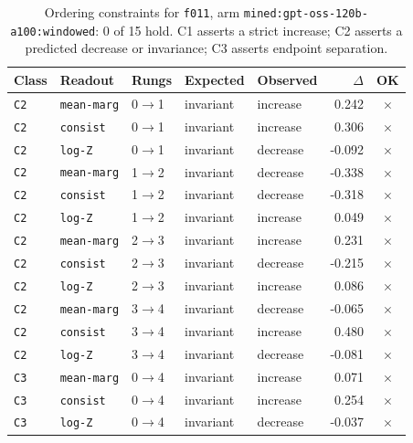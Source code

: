 \documentclass[11pt]{article}
\begin{document}
\begin{table}[htbp]
\centering
\small
\caption{Ordering constraints for \texttt{f011}, arm \texttt{mined:gpt-oss-120b-a100:windowed}: 0 of 15 hold. C1 asserts a strict increase; C2 asserts a predicted decrease or invariance; C3 asserts endpoint separation.}
\label{tab:ladder-f011-mined-gpt-oss-120b-a100-windowed}
\begin{tabular}{lllllrc}
\toprule
Class & Readout & Rungs & Expected & Observed & $\Delta$ & OK \\
\midrule
\texttt{C2} & \texttt{mean-marg} & 0$\to$1 & invariant & increase & 0.242 & $\times$ \\
\texttt{C2} & \texttt{consist} & 0$\to$1 & invariant & increase & 0.306 & $\times$ \\
\texttt{C2} & \texttt{log-Z} & 0$\to$1 & invariant & decrease & -0.092 & $\times$ \\
\texttt{C2} & \texttt{mean-marg} & 1$\to$2 & invariant & decrease & -0.338 & $\times$ \\
\texttt{C2} & \texttt{consist} & 1$\to$2 & invariant & decrease & -0.318 & $\times$ \\
\texttt{C2} & \texttt{log-Z} & 1$\to$2 & invariant & increase & 0.049 & $\times$ \\
\texttt{C2} & \texttt{mean-marg} & 2$\to$3 & invariant & increase & 0.231 & $\times$ \\
\texttt{C2} & \texttt{consist} & 2$\to$3 & invariant & decrease & -0.215 & $\times$ \\
\texttt{C2} & \texttt{log-Z} & 2$\to$3 & invariant & increase & 0.086 & $\times$ \\
\texttt{C2} & \texttt{mean-marg} & 3$\to$4 & invariant & decrease & -0.065 & $\times$ \\
\texttt{C2} & \texttt{consist} & 3$\to$4 & invariant & increase & 0.480 & $\times$ \\
\texttt{C2} & \texttt{log-Z} & 3$\to$4 & invariant & decrease & -0.081 & $\times$ \\
\texttt{C3} & \texttt{mean-marg} & 0$\to$4 & invariant & increase & 0.071 & $\times$ \\
\texttt{C3} & \texttt{consist} & 0$\to$4 & invariant & increase & 0.254 & $\times$ \\
\texttt{C3} & \texttt{log-Z} & 0$\to$4 & invariant & decrease & -0.037 & $\times$ \\
\bottomrule
\end{tabular}
\end{table}
\end{document}
